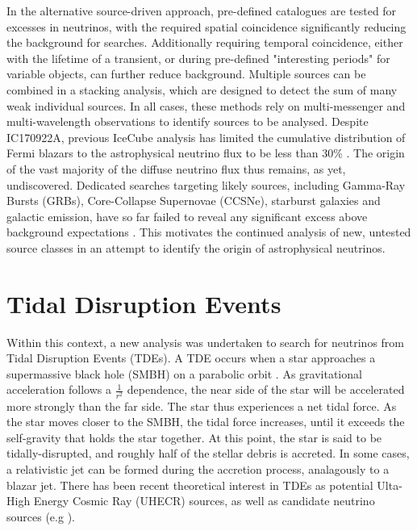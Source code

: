\documentclass{PoS}
\begin{document}
In the alternative source-driven approach, pre-defined catalogues are tested for excesses in neutrinos, with the required spatial coincidence significantly reducing the background for searches. Additionally requiring temporal coincidence, either with the lifetime of a transient, or during  pre-defined "interesting periods" for variable objects, can further reduce background. Multiple sources can be combined in a stacking analysis, which are designed to detect the sum of many weak individual sources. In all cases, these methods rely on multi-messenger and multi-wavelength observations to identify sources to be analysed. Despite IC170922A, previous IceCube analysis has limited the cumulative distribution of Fermi blazars to the astrophysical neutrino flux to be less than 30\% \cite{Aartsen:2016lir}. The origin of the vast majority of the diffuse neutrino flux thus remains, as yet, undiscovered. Dedicated searches targeting likely sources, including Gamma-Ray Bursts (GRBs), Core-Collapse Supernovae (CCSNe), starburst galaxies and galactic emission, have so far failed to reveal any significant excess above background expectations \cite{Stasik2018Search}. This motivates the continued analysis of new, untested source classes in an attempt to identify the origin of astrophysical neutrinos.

\section{Tidal Disruption Events}

Within this context, a new analysis was undertaken to search for neutrinos from Tidal Disruption Events (TDEs). A TDE occurs when a star approaches a supermassive black hole (SMBH) on a parabolic orbit \cite{Komossa:2015qya}. As gravitational acceleration follows a $\frac{1}{r^{2}}$ dependence, the near side of the star will be accelerated more strongly than the far side. The star thus experiences a net tidal force. As the star moves closer to the SMBH, the tidal force increases, until it exceeds the self-gravity that holds the star together. At this point, the star is said to be tidally-disrupted, and roughly half of the stellar debris is accreted. In some cases, a relativistic jet can be formed during the accretion process, analagously to a blazar jet. There has been recent theoretical interest in TDEs as potential Ulta-High Energy Cosmic Ray (UHECR) sources, as well as candidate neutrino sources (e.g \cite{Biehl:2017hnb}).
\end{document}
